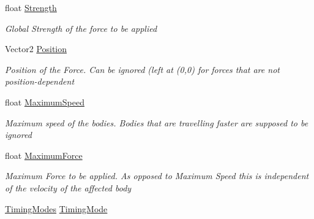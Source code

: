 \begin{DoxyCompactItemize}
\item 
float \hyperlink{class_farseer_physics_1_1_controllers_1_1_abstract_force_controller_a230fc053e7e9335afe69278fb6fc282f}{Strength}
\begin{DoxyCompactList}\small\item\em Global Strength of the force to be applied \end{DoxyCompactList}\item 
Vector2 \hyperlink{class_farseer_physics_1_1_controllers_1_1_abstract_force_controller_a4bac624e53c1adcfe1b9c9a876cf49d9}{Position}
\begin{DoxyCompactList}\small\item\em Position of the Force. Can be ignored (left at (0,0) for forces that are not position-\/dependent \end{DoxyCompactList}\item 
float \hyperlink{class_farseer_physics_1_1_controllers_1_1_abstract_force_controller_a74f774f4b684643afe72823f6783fb8f}{Maximum\+Speed}
\begin{DoxyCompactList}\small\item\em Maximum speed of the bodies. Bodies that are travelling faster are supposed to be ignored \end{DoxyCompactList}\item 
float \hyperlink{class_farseer_physics_1_1_controllers_1_1_abstract_force_controller_a8bae1d3d1b67ab840c8c6e79ba478a83}{Maximum\+Force}
\begin{DoxyCompactList}\small\item\em Maximum Force to be applied. As opposed to Maximum Speed this is independent of the velocity of the affected body \end{DoxyCompactList}\item 
\hyperlink{class_farseer_physics_1_1_controllers_1_1_abstract_force_controller_a5dc6c4b2c041b7c5c084873d89b4b62b}{Timing\+Modes} \hyperlink{class_farseer_physics_1_1_controllers_1_1_abstract_force_controller_a06483288a809c2ade1c8b686d8aec4e7}{Timing\+Mode}

\end{DoxyCompactItemize}
